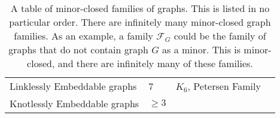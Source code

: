 \begin{table}[h!]
\begin{tabular}{@{}llll@{}}
    Linklessly Embeddable graphs & 7                                  & $K_6$, Petersen Family                           & \tablefootnote{\textcite{conwayKnotsLinksSpatial1983}} \\
    Knotlessly Embeddable graphs & $\geq 3$                           &                                                  & \tablefootnote{\textcite{conwayKnotsLinksSpatial1983,foisyIntrinsicallyKnottedGraphs2002,foisyIntrinsicallyKnottedGraphs2002}}          
    \end{tabular}
    \caption[Table of Minor-Closed Families of graphs]{A table of minor-closed families of graphs. This is listed in no particular order. There are infinitely many minor-closed graph families. As an example, a family $\mathcal{F}_G$ could be the family of graphs that do not contain graph $G$ as a minor. This is minor-closed, and there are infinitely many of these families.}
    \end{table}
